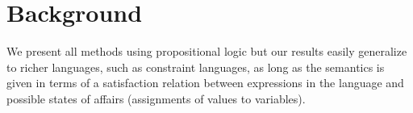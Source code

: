 \documentclass[twoside,11pt]{article}
\newcommand\comment[1]{\marginpar{\tiny #1}}
\renewcommand\comment[1]{#1}
\newcommand{\emilio}[1]{{\comment{\color{red}Emilio: #1}}}
\newcommand\maxsat{\texttt{MaxSAT}}
\begin{document}
%

\section{Background}\label{sec:background}

We present all methods using propositional logic but our results easily generalize to richer languages, such as constraint languages, as long as the semantics is given in terms of a satisfaction relation between expressions in the language and possible states of affairs (assignments of values to variables).
\end{document}
